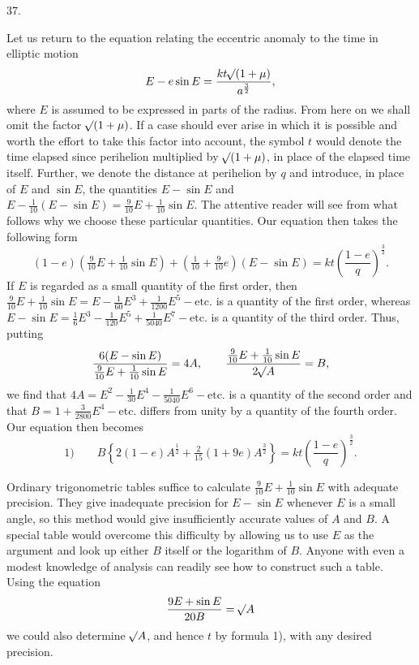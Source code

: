 \par{}
\begin{center}
37.
\end{center}
Let us return to the equation relating the eccentric anomaly to the time in elliptic motion
\[
E-e\sin E=\frac{kt\mathord{{}^{}\!\surd}(1+\mu)}{a^{\frac{3}{2}}},
\]
where $E$ is assumed to be expressed in parts of the radius. From here on we shall omit the factor $\mathord{{}^{}\!\surd}(1+\mu)$. If a case should ever arise in which it is possible and worth the effort to take this factor into account, the symbol $t$ would denote the time elapsed since perihelion multiplied by $\mathord{{}^{}\!\surd}(1+\mu)$, in place of the elapsed time itself. Further, we denote the distance at perihelion by $q$ and introduce, in place of $E$ and $\sin E$, the quantities $E-\sin E$ and $E-\tfrac{1}{10}(E-\sin E)=\tfrac{9}{10}E+\tfrac{1}{10}\sin E$. The attentive reader will see from what follows why we choose these particular quantities. Our equation then takes the following form
\[
(1-e)(\tfrac{9}{10}E+\tfrac{1}{10}\sin E)+(\tfrac{1}{10}+\tfrac{9}{10}e)(E-\sin E)=kt\left(\frac{1-e}{q}\right)^{\frac{3}{2}}.
\]
If $E$ is regarded as a small quantity of the first order, then $\tfrac{9}{10}E+\tfrac{1}{10}\sin E=E-\tfrac{1}{60}E^3+\tfrac{1}{1200}E^5-\text{etc.}$ is a quantity of the first order, whereas $E-\sin E=\tfrac{1}{6} E^3-\tfrac{1}{120}E^5+\tfrac{1}{5040}E^7-\text{etc.}$ is a quantity of the third order. Thus, putting
\[
\frac{6(E-\sin E)}{\frac{9}{10}E+\frac{1}{10}\sin E}=4A,\qquad
\frac{\frac{9}{10}E+\frac{1}{10}\sin E}{2\mathord{{}^{}\!\surd}A}=B,
\]
we find that $4A=E^2-\tfrac{1}{30}E^4-\tfrac{1}{5040}E^6-\text{etc.}$ is a quantity of the second order and that $B=1+\tfrac{3}{2800}E^4-\text{etc.}$ differs from unity by a quantity of the fourth order. Our equation then becomes
\[
\text{1)}\qquad B\left\{2(1-e)A^{\frac{1}{2}}+\tfrac{2}{15}(1+9e)A^{\frac{3}{2}}\right\}=kt\left(\frac{1-e}{q}\right)^{\frac{3}{2}}.
\]

Ordinary trigonometric tables suffice to calculate $\tfrac{9}{10}E+\tfrac{1}{10}\sin E$ with adequate precision. They give inadequate precision for $E-\sin E$ whenever $E$ is a small angle, so this method would give insufficiently accurate values of $A$ and $B$. A special table would overcome this difficulty by allowing us to use $E$ as the argument and look up either $B$ itself or the logarithm of $B$. Anyone with even a modest knowledge of analysis can readily see how to construct such a table. Using the equation
\[
\frac{9E+\sin E}{20B}=\mathord{{}^{}\!\surd}A
\]
we could also determine $\mathord{{}^{}\!\surd}A$, and hence $t$ by formula 1), with any desired precision.

